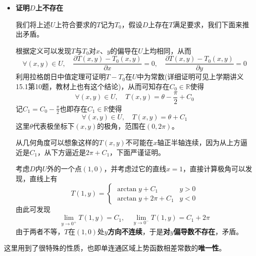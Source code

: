\documentclass[a4paper,UTF8,fontset=windows,AutoFakeBold]{ctexart}
\newcommand*{\dr}{\hspace{0.07em}\mathrm{d}}
\newcommand*{\rb}{\mathbb{R}}
\newcommand*{\note}{\noindent *}
\theoremstyle{ex}
\begin{document}
\begin{framed}
{\begin{itemize}
        用下标$t$表示对$t$求导，直接计算有$L_1$上
        $$x_t=0,\quad y_t=1$$
        $L_2$上
        $$x_t=-r_0\sin t,\quad y_t=r_0\cos t$$
        代入$\dr x=x_t\dr t$、$\dr y=y_t\dr t$与$x$、$y$的参数方程可计算得
        $$T(p,q)=\int_1^{r_0}\frac{0}{t^2}\dr t+\int_{\pi/2}^\theta\frac{r_0^2}{r_0^2}\dr t=\theta-\frac{\pi}{2}$$
        由于在极坐标的上述定义下每个$(p,q)$对应唯一一个$\theta$，这已经是符合要求的$T$。

        \item \textbf{证明$D$上不存在}
        
        我们将上述$U$上符合要求的$T$记为$T_0$，假设$D$上存在$T$满足要求，我们下面来推出矛盾。

        根据定义可以发现$T$与$T_0$对$x$、$y$的偏导在$U$上均相同，从而
        $$\forall(x,y)\in U,\quad\frac{\partial T(x,y)-T_0(x,y)}{\partial x}=0,\quad \frac{\partial T(x,y)-T_0(x,y)}{\partial y}=0$$
        利用拉格朗日中值定理可证明$T-T_0$在$U$中为常数(详细证明可见上学期讲义15.1第10题，教材上也有这个结论)，从而可知存在$C_0\in\rb$使得
        $$\forall(x,y)\in U,\quad T(x,y)=\theta-\frac{\pi}{2}+C_0$$
        记$C_1=C_0-\frac{\pi}{2}$也即存在$C_1\in\rb$使得
        $$\forall(x,y)\in U,\quad T(x,y)=\theta+C_1$$
        这里$\theta$代表极坐标下$(x,y)$的极角，范围在$(0,2\pi)$。

        \note 从几何角度可以想象这样的$T(x,y)$不可能在$x$轴正半轴连续，因为从上方逼近是$C_1$，从下方逼近是$2\pi+C_1$，下面严谨证明。

        考虑$D$内$U$外的一个点$(1,0)$，并考虑过它的直线$x=1$，直接计算极角可以发现，直线上有
        $$T(1,y)=\begin{cases}\arctan y+C_1&y>0\\\arctan y+2\pi+C_1&y<0\end{cases}$$
        由此可发现
        $$\lim_{y\to0^+}T(1,y)=C_1,\quad\lim_{y\to0^-}T(1,y)=C_1+2\pi$$
        由于两者不等，$T$在$(1,0)$处\textbf{$y$方向不连续}，于是\textbf{对$y$偏导数不存在}，矛盾。
    \end{itemize}
}
\end{framed}

\note 这里用到了很特殊的性质，也即单连通区域上势函数相差常数的\textbf{唯一性}。
\end{document}

